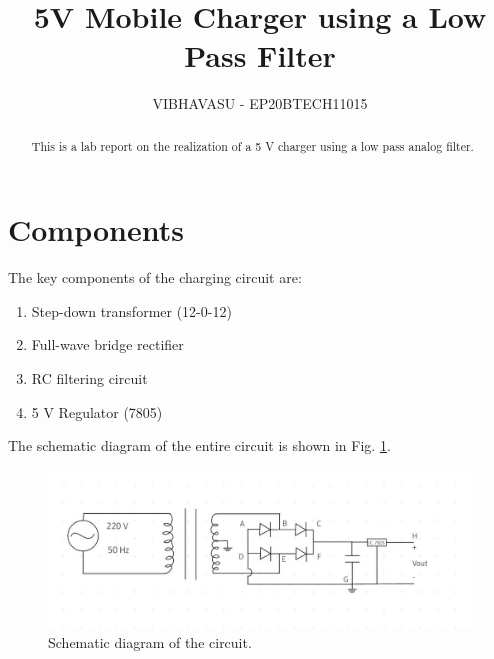 \documentclass[journal,12pt,twocolumn]{IEEEtran}
\begin{document}
	\let\StandardTheFigure\thefigure
	\renewcommand{\thefigure}{\arabic{section}.\arabic{figure}}
	\makeatletter
	\makeatother
	
	
	\def\putbox#1#2#3{\makebox[0in][l]{\makebox[#1][l]{}\raisebox{\baselineskip}[0in][0in]{\raisebox{#2}[0in][0in]{#3}}}}
	\def\rightbox#1{\makebox[0in][r]{#1}}
	\def\centbox#1{\makebox[0in]{#1}}
	\def\topbox#1{\raisebox{-\baselineskip}[0in][0in]{#1}}
	\def\midbox#1{\raisebox{-0.5\baselineskip}[0in][0in]{#1}}
	
	
	\title{5V Mobile Charger using a Low Pass Filter}
	\author{VIBHAVASU - EP20BTECH11015}
	\maketitle
	\tableofcontents
	\renewcommand{\thetable}{\theenumi}
	\bigskip
	\begin{abstract}
		This is a lab report on the realization of a 5 V charger using
		a low pass analog filter.
	\end{abstract}
	\section{Components}
	The key components of the charging circuit are:
	\begin{enumerate}
		\item Step-down transformer (12-0-12)
		\item Full-wave bridge rectifier
		\item RC filtering circuit
		\item 5 V Regulator (7805)
	\end{enumerate}
	
	The schematic diagram of the entire circuit is shown in Fig. \ref{fig:ckt}.
	\begin{figure}[!htb]
		\includegraphics[width=1.1\columnwidth]{figs/ckt.jpeg}
		\caption{Schematic diagram of the circuit.}
		\label{fig:ckt}
	\end{figure}
\end{document}
